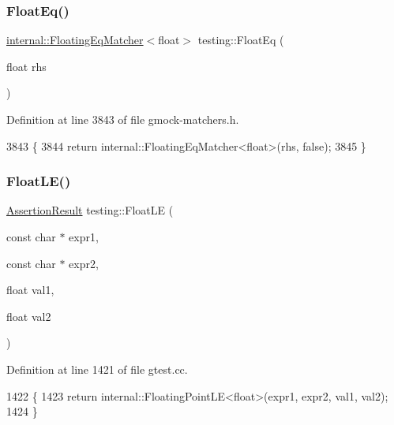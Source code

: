 \subsubsection{\texorpdfstring{Float\+Eq()}{FloatEq()}}
{\footnotesize\ttfamily \hyperlink{classtesting_1_1internal_1_1FloatingEqMatcher}{internal\+::\+Floating\+Eq\+Matcher}$<$float$>$ testing\+::\+Float\+Eq (\begin{DoxyParamCaption}\item[{float}]{rhs }\end{DoxyParamCaption})\hspace{0.3cm}{\ttfamily [inline]}}



Definition at line 3843 of file gmock-\/matchers.\+h.


\begin{DoxyCode}
3843                                                            \{
3844   \textcolor{keywordflow}{return} internal::FloatingEqMatcher<float>(rhs, \textcolor{keyword}{false});
3845 \}
\end{DoxyCode}
\mbox{\label{namespacetesting_a2c9a2a391c72a7b02ea3024586e33af0}} 
\subsubsection{\texorpdfstring{Float\+L\+E()}{FloatLE()}}
{\footnotesize\ttfamily \hyperlink{classtesting_1_1AssertionResult}{Assertion\+Result} testing\+::\+Float\+LE (\begin{DoxyParamCaption}\item[{const char $\ast$}]{expr1,  }\item[{const char $\ast$}]{expr2,  }\item[{float}]{val1,  }\item[{float}]{val2 }\end{DoxyParamCaption})}



Definition at line 1421 of file gtest.\+cc.


\begin{DoxyCode}
1422                                                 \{
1423   \textcolor{keywordflow}{return} internal::FloatingPointLE<float>(expr1, expr2, val1, val2);
1424 \}
\end{DoxyCode}
\mbox{\label{namespacetesting_a933a78452dd1770669bed758f35ff250}} 
